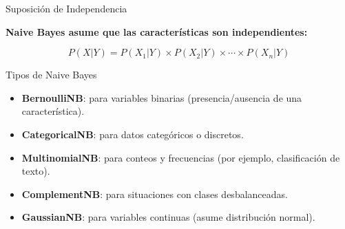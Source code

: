 \documentclass{beamer}
\begin{document}
\begin{frame}{Suposición de Independencia}
    \begin{center}
        \textbf{Naive Bayes asume que las características son independientes:}
        
        \[
        P(X|Y) = P(X_1|Y) \times P(X_2|Y) \times \cdots \times P(X_n|Y)
        \]
        
        \vspace{0.8cm}
        
    \end{center}
\end{frame}

\begin{frame}{Tipos de Naive Bayes}
    \begin{itemize}
        \item \textbf{BernoulliNB}: para variables binarias (presencia/ausencia de una característica).
        \item \textbf{CategoricalNB}: para datos categóricos o discretos.
        \item \textbf{MultinomialNB}: para conteos y frecuencias (por ejemplo, clasificación de texto).
        \item \textbf{ComplementNB}: para situaciones con clases desbalanceadas.
        \item \textbf{GaussianNB}: para variables continuas (asume distribución normal).
    \end{itemize}
\end{frame}
\end{document}
